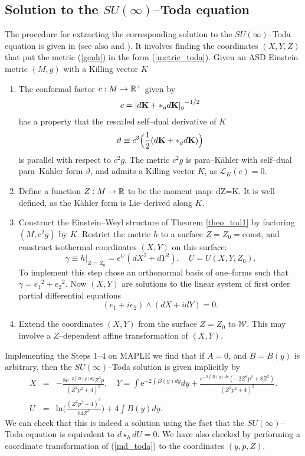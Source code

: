 \subsection{Solution to the $SU(\infty)$--Toda equation}
\label{steps_sec}
The procedure for extracting the corresponding solution to the $SU(\infty)$--Toda equation is given in \cite{Tod_note} 
(see also \cite{LeBrun} and \cite{DT}). It involves finding the coordinates $(X,Y,Z)$ that put the metric (\ref{genh}) in the 
form (\ref{metric_toda}). Given an ASD Einstein metric $(M, g)$ with a
Killing vector $K$
\begin{enumerate}
\item The conformal factor $c:M\rightarrow \mathbb{R}^+$  given by
\[
c={|d{\bf K}+*_g d{\bf K}|_{g}}^{-1/2}
\]
has a property that
the rescaled self--dual derivative of $K$
\[
\vartheta\equiv c^3\Big(\frac{1}{2}(d{\bf K}+*_g d{\bf K})\Big)
\]
is parallel with respect to $c^2 g$.
The metric $c^2g$ is para--K\"ahler with  self--dual 
para--K\"ahler form $\vartheta$, and admits a Killing vector $K$, as
${\mathcal L}_K(c)=0$.
\item
Define a function $Z:M\rightarrow \mathbb{R}$ to be the moment map:
\be
\label{ztilde}
dZ=K\hook \vartheta.
\ee
It is well defined, as the K\"ahler form is Lie--derived along $K$.
\item
Construct the Einstein--Weyl structure of Theorem \ref{theo_tod1}
by factoring $(M, c^2g)$ by $K$. Restrict the metric $h$
to a surface $Z=Z_0=\mbox{const}$, and construct isothermal coordinates 
$(X, Y)$ on this surface:
\[
\gamma\equiv h|_{Z=Z_0}=e^{U}(dX^2+dY^2), \quad U=U(X, Y, Z_0).
\]
To implement this step chose an orthonormal basis of one--forms
such that $\gamma= {e_1}^2+{e_2}^2$. Now $(X, Y)$ are solutions to the linear
system of first order partial differential equations
\[
(e_1+ie_2)\wedge (dX+idY)=0.
\]
\item Extend the coordinates $(X, Y)$ from the surface $Z=Z_0$ to $\mathcal{W}$. This may
involve a $Z$--dependent affine transformation of $(X, Y)$.
\end{enumerate}
Implementing the Steps 1--4 on MAPLE we find that if $A=0$, and $B=B(y)$ 
is arbitrary, then the $SU(\infty)$--Toda solution is given implicitly by
\begin{eqnarray}
\label{toda_implicit1}
 X&=&-\frac{8\mathrm{e}^{-2\int{B(y)dy}}Z^3p}{(Z^2p^2+4)^2},\quad
Y=\int{\mathrm{e}^{-2\int{B(y)dy}}dy}+\frac{\mathrm{e}^{-2\int{B(y)dy}}(-2Z^4p^2+8Z^2)}{(Z^2p^2+4)^2}.\nonumber\\
U&=&\mathrm{ln}\bigg(\frac{(Z^2p^2+4)^3}{64Z^2}\bigg)+4\int{B(y)dy}.
\end{eqnarray}
We can check that this is indeed a solution using the fact that the $SU(\infty)$--Toda equation is equivalent to 
$d\star_h dU=0$. We have also checked by performing a coordinate transformation of (\ref{md_toda}) to the coordinates $(y,p,Z)$.

